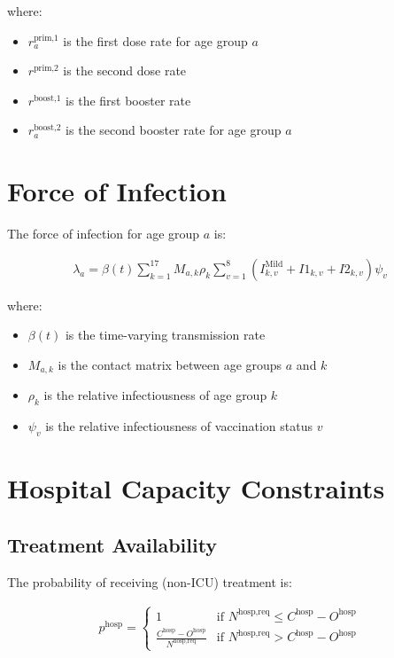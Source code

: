 \documentclass[12pt]{article}
\begin{document}
where:

\begin{itemize}
    \item $r^{\text{prim,1}}_a$ is the first dose rate for age group $a$
    \item $r^{\text{prim,2}}$ is the second dose rate
    \item $r^{\text{boost,1}}$ is the first booster rate
    \item $r^{\text{boost,2}}_a$ is the second booster rate for age group $a$
\end{itemize}

\section{Force of Infection}

The force of infection for age group $a$ is:

\begin{align*}
\lambda_a = \beta(t) \sum_{k=1}^{17} M_{a,k} \rho_k \sum_{v=1}^8 \left( I^{\text{Mild}}_{k,v} + I1_{k,v} + I2_{k,v} \right) \psi_v
\end{align*}

where:
\begin{itemize}
    \item $\beta(t)$ is the time-varying transmission rate
    \item $M_{a,k}$ is the contact matrix between age groups $a$ and $k$
    \item $\rho_k$ is the relative infectiousness of age group $k$
    \item $\psi_v$ is the relative infectiousness of vaccination status $v$
\end{itemize}

\section{Hospital Capacity Constraints}

\subsection{Treatment Availability}

The probability of receiving (non-ICU) treatment is:

\begin{align*}
p^{\text{hosp}} = \begin{cases}
1 & \text{if } N^{\text{hosp,req}} \leq C^{\text{hosp}} - O^{\text{hosp}} \\
\frac{C^{\text{hosp}} - O^{\text{hosp}}}{N^{\text{hosp,req}}} & \text{if } N^{\text{hosp,req}} > C^{\text{hosp}} - O^{\text{hosp}}
\end{cases}
\end{align*}
\end{document}
